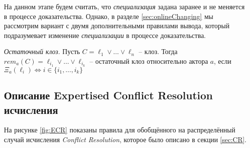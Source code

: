 На данном этапе будем считать, что \emph{специализация} задана заранее и не меняется в процессе доказательства. Однако, в разделе \ref{sec:onlineChanging} мы рассмотрим вариант с двумя дополнительными правилами вывода, который подразумевает изменение \emph{специализации} в процессе доказательства.

\begin{definition}
	\emph{Остаточный клоз.} Пусть $C = \ell_1 \vee \ldots \vee \ell_n$ -- клоз. Тогда $rem_a(C) = \ell_{i_1} \vee \ldots \vee \ell_{i_k}$ -- остаточный клоз относительно актора $a$, если $\Xi_a(\ell_i) \iff i \in \{i_1, \ldots, i_k\}$
\end{definition}


\subsection{Описание Expertised Conflict Resolution исчисления}

На рисунке \ref{fig:ECR} показаны правила для обобщённого на распределённый случай исчисления \emph{Conflict Resolution}, которое было описано в секции \ref{sec:CR}. \par

